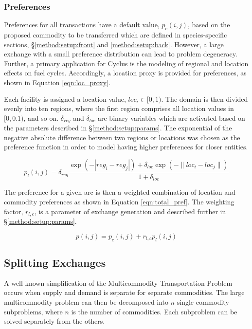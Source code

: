 \subsubsection{Preferences}\label{method:setup:features:prefs}

Preferences for all transactions have a default value, $p_{c}(i, j)$, based on
the proposed commodity to be transferred which are defined in species-specific
sections, \S \ref{method:setup:front} and \ref{method:setup:back}. However, a
large exchange with a small preference distribution can lead to problem
degeneracy. Further, a primary application for Cyclus is the modeling of
regional and location effects on fuel cycles. Accordingly, a location proxy is
provided for preferences, as shown in Equation \ref{eqn:loc_proxy}.

Each facility is assigned a location value, $loc_i \in [0, 1)$. The domain is
  then divided evenly into ten regions, where the first region comprises all
  location values in $[0, 0.1)$, and so on. $\delta_{reg}$ and $\delta_{loc}$
    are binary variables which are activated based on the parameters described
    in \S \ref{method:setup:params}. The exponential of the negative absolute
    difference between two regions or locations was chosen as the preference
    function in order to model having higher preferences for closer entities.

\begin{equation}\label{eqn:loc_proxy}
p_{l}(i, j) = \delta_{reg} \frac{\exp(- | reg_{i} - reg_{j} | ) + \delta_{loc}
  \exp(- \| loc_{i} - loc_{j} \| )}{1 + \delta_{loc}}
\end{equation}

The preference for a given arc is then a weighted combination of location and
commodity preferences as shown in Equation \ref{eqn:total_pref}. The weighting
factor, $r_{l, c}$, is a parameter of exchange generation and described further
in \S \ref{method:setup:params}.

\begin{equation}\label{eqn:total_pref}
p(i, j) = p_{c}(i, j) + r_{l, c} p_{l}(i, j)
\end{equation}

\subsection{Splitting Exchanges}\label{method:setup:split}

A well known simplification of the Multicommodity Transportation Problem occurs
when supply and demand is separate for separate commodities. The large
multicommodity problem can then be decomposed into $n$ single commodity
subproblems, where $n$ is the number of commodities. Each subproblem can be
solved separately from the others.

